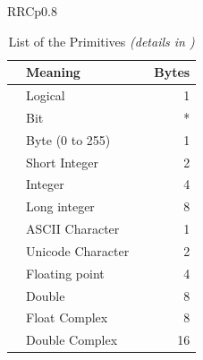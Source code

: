 \begin{tabular}{RRCp{0.8\textwidth}}
\ifhtx\label{primitives}
\begin{center}
\else
\begin{table}[hbt]
 \begin{center}\begin{tabular}{|r|l|c|r|}
\fi\hline
  {\attr{datatype}} & Meaning & \attr{FITS} &
      { Bytes} \\
 \hline
 \literalvalue{boolean}      & Logical         &\literalvalue{L}& 1  \\
 \literalvalue{bit}          & Bit             &\literalvalue{X}& *  \\
 \literalvalue{unsignedByte} & Byte (0 to 255) &\literalvalue{B}& 1  \\
 \literalvalue{short}        & Short Integer   &\literalvalue{I}& 2  \\
 \literalvalue{int}          & Integer         &\literalvalue{J}& 4  \\
 \literalvalue{long}         & Long integer    &\literalvalue{K}& 8  \\
 \literalvalue{char}         & ASCII Character &\literalvalue{A}& 1  \\
 \literalvalue{unicodeChar}  & Unicode Character&        & 2 \\
 \literalvalue{float}        & Floating point  &\literalvalue{E}& 4  \\
 \literalvalue{double}       & Double          &\literalvalue{D}& 8  \\
 \literalvalue{floatComplex} & Float Complex   &\literalvalue{C}& 8  \\
 \literalvalue{doubleComplex}& Double Complex  &\literalvalue{M}& 16 \\
\hline\end{tabular}\end{center}
\ifhtx\par
\else\caption{\label{primitives}List of the Primitives
{\em(details in )}}\end{table}
\fi


\end{center}
\end{tabular}
